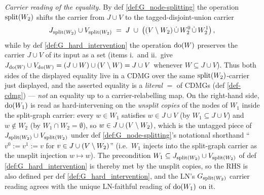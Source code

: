 \documentclass[main]{subfiles}
\begin{document}
\begin{Lem}
    \medskip\emph{Carrier reading of the equality.}
    By def \ref{def:G_node-splitting} the operation $\mathrm{split}(W_2)$ shifts the carrier from $J \cup V$ to the tagged-disjoint-union carrier
    \[ J_{\mathrm{split}(W_2)} \cup V_{\mathrm{split}(W_2)} \;=\; J \;\cup\; \left ( (V \setminus W_2) \,\dot{\cup}\, W_2^0 \,\dot{\cup}\, W_2^1 \right ), \]
    while by def \ref{def:G_hard_intervention} the operation $\operatorname{do}(W)$ preserves the carrier $J \cup V$ of its input as a set (items i.\ and ii.\ give $J_{\operatorname{do}(W)} \cup V_{\operatorname{do}(W)} = (J \cup W) \cup (V \setminus W) = J \cup V$ whenever $W \subseteq J \cup V$). Thus both sides of the displayed equality live in a CDMG over the same $\mathrm{split}(W_2)$-carrier just displayed, and the asserted equality is a \emph{literal} $=$ of CDMGs (def \ref{def-cdmg}) --- \emph{not} an equality up to a carrier-relabelling map. On the right-hand side, $\operatorname{do}(W_1)$ is read as hard-intervening on the \emph{unsplit copies} of the nodes of $W_1$ inside the split-graph carrier: every $w \in W_1$ satisfies $w \in J \cup V$ (by $W_1 \subseteq J \cup V$) and $w \notin W_2$ (by $W_1 \cap W_2 = \emptyset$), so $w \in J \cup (V \setminus W_2)$, which is the untagged piece of $J_{\mathrm{split}(W_2)} \cup V_{\mathrm{split}(W_2)}$ under def \ref{def:G_node-splitting}'s notational shorthand ``$v^0 := v^1 := v$ for $v \in J \cup (V \setminus W_2)$'' (i.e.\ $W_1$ injects into the split-graph carrier as the unsplit injection $w \mapsto w$). The precondition $W_1 \subseteq J_{\mathrm{split}(W_2)} \cup V_{\mathrm{split}(W_2)}$ of def \ref{def:G_hard_intervention} is thereby met by the unsplit copies, so the RHS is also defined per def \ref{def:G_hard_intervention}, and the LN's $G_{\mathrm{split}(W_2)}$ carrier reading agrees with the unique LN-faithful reading of $\operatorname{do}(W_1)$ on it.
\end{Lem}
\end{document}

